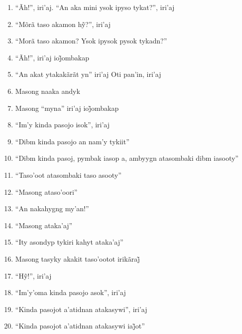 \begin{enumerate}
 \item ``Ãh!'', iri'aj. ``An aka mini ysok ipyso tykat?'', iri'aj

 \item ``Mõrã taso akamon hỹ?'', iri’aj

 \item ``Morã taso akamon? Ysok ipysok pysok tykadn?''

 \item ``Ãh!'', iri’aj ioj̃ombakap

 \item ``An akat ytakakãrãt yn'' iri'aj Oti pan'in, iri'aj

 \item Masong naaka andyk

 \begin{center}\end{center}

 \item Masong ``myna'' iri’aj ioj̃ombakap

 \item ``Im'y kinda pasojo isok'', iri'aj

 \item ``Dibm kinda pasojo an nam'y tykiit''

 \item ``Dibm kinda pasoj, pymbak iasop a, ambyygn atasombaki dibm iasooty''

 \item ``Taso'oot atasombaki taso asooty''

 \item ``Masong ataso'oori''

 \item ``An nakahygng my'an!''

 \item ``Masong ataka'aj''

 \item ``Ity asondyp tykiri kahyt ataka'aj''

 \item Masong tasyky akakit taso’ootot irikãraj̃

 \item ``Hỹ!'', iri’aj

 \item ``Im'y'oma kinda pasojo asok'', iri'aj

 \item ``Kinda pasojot a'atidnan atakasywi'', iri'aj

 \item ``Kinda pasojot a’atidnan atakasywi iaj̃ot''


\end{enumerate}
